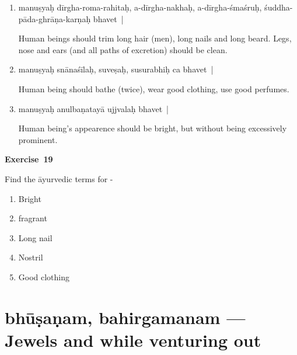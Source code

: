 \begin{enumerate}
\itemsep=0pt
\item {}

manuṣyaḥ dīrgha-roma-rahitaḥ, a-dīrgha-nakhaḥ, a-dīrgha-śmaśruḥ, śuddha-pāda-ghrāṇa-karṇaḥ bhavet~| 

Human beings should trim long hair (men), long nails and long beard. Legs, nose and ears (and all paths of excretion) should be clean.   

\item {}

manuṣyaḥ snānaśīlaḥ, suveṣaḥ, susurabhiḥ ca bhavet~|

Human being should bathe (twice), wear good clothing, use good perfumes.   

\item {}

manuṣyaḥ anulbaṇatayā ujjvalaḥ bhavet~|

Human being’s appearence should be bright, but without being excessively prominent.
\end{enumerate}

\centerline{\textbf{Exercise~19}}

Find the āyurvedic terms for -
\begin{enumerate}
\itemsep=0pt
\renewcommand{\theenumi}{\alph{enumi}}
\renewcommand{\labelenumi}{\theenumi.}
\item Bright
\item fragrant
\item Long nail
\item Nostril
\item Good clothing
\end{enumerate}

\chapter{bhūṣaṇam, bahirgamanam --- Jewels and while venturing out}

